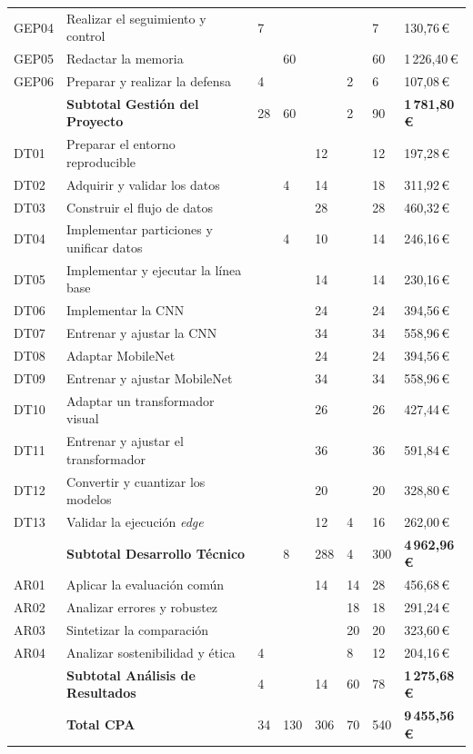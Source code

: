 \begin{longtable}{L{1.1cm}L{5.5cm}R{0.7cm}R{0.7cm}R{0.7cm}R{0.7cm}R{0.7cm}R{2.0cm}}
    GEP04 & Realizar el seguimiento y control & 7 & & & & 7 & 130,76\,€ \\
    GEP05 & Redactar la memoria & & 60 & & & 60 & 1\,226,40\,€ \\
    GEP06 & Preparar y realizar la defensa & 4 & & & 2 & 6 & 107,08\,€ \\
    \midrule
    & \textbf{Subtotal Gestión del Proyecto} & 28 & 60 & & 2 & 90 & \textbf{1\,781,80\,€} \\
    \midrule
    DT01 & Preparar el entorno reproducible & & & 12 & & 12 & 197,28\,€ \\
    DT02 & Adquirir y validar los datos & & 4 & 14 & & 18 & 311,92\,€ \\
    DT03 & Construir el flujo de datos & & & 28 & & 28 & 460,32\,€ \\
    DT04 & Implementar particiones y unificar datos & & 4 & 10 & & 14 & 246,16\,€ \\
    DT05 & Implementar y ejecutar la línea base & & & 14 & & 14 & 230,16\,€ \\
    DT06 & Implementar la CNN & & & 24 & & 24 & 394,56\,€ \\
    DT07 & Entrenar y ajustar la CNN & & & 34 & & 34 & 558,96\,€ \\
    DT08 & Adaptar MobileNet & & & 24 & & 24 & 394,56\,€ \\
    DT09 & Entrenar y ajustar MobileNet & & & 34 & & 34 & 558,96\,€ \\
    DT10 & Adaptar un transformador visual & & & 26 & & 26 & 427,44\,€ \\
    DT11 & Entrenar y ajustar el transformador & & & 36 & & 36 & 591,84\,€ \\
    DT12 & Convertir y cuantizar los modelos & & & 20 & & 20 & 328,80\,€ \\
    DT13 & Validar la ejecución \emph{edge} & & & 12 & 4 & 16 & 262,00\,€ \\
    \midrule
    & \textbf{Subtotal Desarrollo Técnico} & & 8 & 288 & 4 & 300 & \textbf{4\,962,96\,€} \\
    \midrule
    AR01 & Aplicar la evaluación común & & & 14 & 14 & 28 & 456,68\,€ \\
    AR02 & Analizar errores y robustez & & & & 18 & 18 & 291,24\,€ \\
    AR03 & Sintetizar la comparación & & & & 20 & 20 & 323,60\,€ \\
    AR04 & Analizar sostenibilidad y ética & 4 & & & 8 & 12 & 204,16\,€ \\
    \midrule
    & \textbf{Subtotal Análisis de Resultados} & 4 & & 14 & 60 & 78 & \textbf{1\,275,68\,€} \\
    \midrule
    & \textbf{Total CPA} & 34 & 130 & 306 & 70 & 540 & \textbf{9\,455,56\,€} \\
  \end{longtable}
\endgroup

